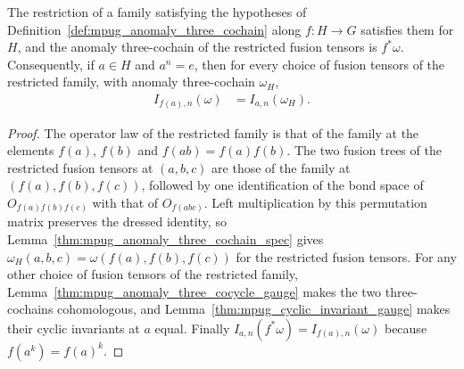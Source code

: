 \begin{lemma}
    \label{thm:mpug_family_restriction_omega}
    \leanok
    The restriction of a family satisfying the hypotheses of
    Definition~\ref{def:mpug_anomaly_three_cochain} along $f\colon H\to G$
    satisfies them for $H$, and the anomaly three-cochain of the restricted
    fusion tensors is $f^*\omega$. Consequently, if $a\in H$ and $a^n=e$,
    then for every choice of fusion tensors of the restricted family, with
    anomaly three-cochain $\omega_H$,
    \begin{align}
        I_{f(a),n}(\omega) & =I_{a,n}(\omega_H).
    \end{align}
\end{lemma}

\begin{proof}\leanok
    The operator law of the restricted family is that of the family at the
    elements $f(a)$, $f(b)$ and $f(ab)=f(a)f(b)$. The two fusion trees of the
    restricted fusion tensors at $(a,b,c)$ are those of the family at
    $(f(a),f(b),f(c))$, followed by one identification of the bond space of
    $O_{f(a)f(b)f(c)}$ with that of $O_{f(abc)}$. Left multiplication by this
    permutation matrix preserves the dressed identity, so
    Lemma~\ref{thm:mpug_anomaly_three_cochain_spec} gives
    $\omega_H(a,b,c)=\omega(f(a),f(b),f(c))$ for the restricted fusion
    tensors. For any other choice of fusion tensors of the restricted family,
    Lemma~\ref{thm:mpug_anomaly_three_cocycle_gauge} makes the two
    three-cochains cohomologous, and
    Lemma~\ref{thm:mpug_cyclic_invariant_gauge} makes their cyclic
    invariants at $a$ equal. Finally $I_{a,n}(f^*\omega)=I_{f(a),n}(\omega)$
    because $f(a^k)=f(a)^k$.
\end{proof}

